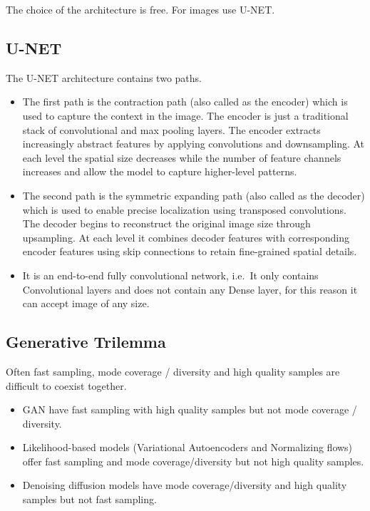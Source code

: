 \documentclass{article}
\begin{document}
The choice of the architecture is free. For images use U-NET.

\subsection{U-NET}\label{u-net}

The U-NET architecture contains two paths.

\begin{itemize}
\tightlist
\item
  The first path is the contraction path (also called as the encoder)
  which is used to capture the context in the image. The encoder is just
  a traditional stack of convolutional and max pooling layers. The
  encoder extracts increasingly abstract features by applying
  convolutions and downsampling. At each level the spatial size
  decreases while the number of feature channels increases and allow the
  model to capture higher-level patterns.
\item
  The second path is the symmetric expanding path (also called as the
  decoder) which is used to enable precise localization using transposed
  convolutions. The decoder begins to reconstruct the original image
  size through upsampling. At each level it combines decoder features
  with corresponding encoder features using skip connections to retain
  fine-grained spatial details.
\item
  It is an end-to-end fully convolutional network, i.e.~It only contains
  Convolutional layers and does not contain any Dense layer, for this
  reason it can accept image of any size.
\end{itemize}

\subsection{Generative Trilemma}\label{generative-trilemma}

Often fast sampling, mode coverage / diversity and high quality samples
are difficult to coexist together.

\begin{itemize}
\tightlist
\item
  GAN have fast sampling with high quality samples but not mode coverage
  / diversity.
\item
  Likelihood-based models (Variational Autoencoders and Normalizing
  flows) offer fast sampling and mode coverage/diversity but not high
  quality samples.
\item
  Denoising diffusion models have mode coverage/diversity and high
  quality samples but not fast sampling.
\end{itemize}
\end{document}
